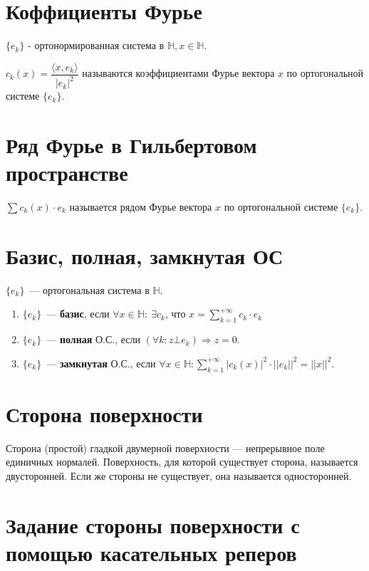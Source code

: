 \documentclass[paper=a4, fontsize=17pt]{article}
\begin{document}
	\section{Коффициенты Фурье}
	$\{e_k\}$ - ортонормированная система в $\mathds{H}, x \in \mathds{H}$.

	$c_k(x) = \dfrac{\langle x, e_k \rangle}{|e_k|^2}$ называются коэффициентами Фурье вектора $x$ по ортогональной системе $\{e_k\}$.

	\section{Ряд Фурье в Гильбертовом пространстве}

	$\sum c_k(x) \cdot e_k$ называется рядом Фурье вектора $x$ по ортогональной системе $\{e_k\}$.

	\section{Базис, полная, замкнутая ОС}

	$\{e_k\}$~--- ортогональная система в $\mathds{H}$.

	\begin{enumerate}

		\item $\{e_k\}$~--- \textbf{базис}, если $\forall x \in \mathds{H}:\ \exists c_k$, что $x = \sum\limits_{k=1}^{+\infty} c_k \cdot e_k$

		\item $\{e_k\}$~--- \textbf{полная} О.С., если $(\forall k: z \bot e_k) \Rightarrow z = 0$.

		\item $\{e_k\}$~--- \textbf{замкнутая} О.С., если $\forall x \in \mathds{H}: \sum\limits_{k=1}^{+\infty} |c_k(x)|^2 \cdot ||e_k||^2 = ||x||^2$.

	\end{enumerate}

	\section{Сторона поверхности}

	Сторона (простой) гладкой двумерной поверхности {{---}} непрерывное поле единичных нормалей. Поверхность, для которой существует сторона, называется двусторонней. Если же стороны не существует, она называется односторонней.


	\section{Задание стороны поверхности с помощью касательных реперов}
\end{document}
